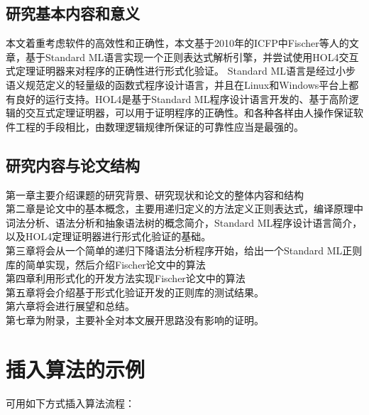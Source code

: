 \documentclass[openany,oneside]{book}
\theoremstyle{definition}
\theoremstyle{definition}
\begin{document}
\section{研究基本内容和意义}
	本文着重考虑软件的高效性和正确性，本文基于2010年的ICFP中Fischer等人的文章，基于Standard ML语言实现一个正则表达式解析引擎，并尝试使用HOL4交互式定理证明器来对程序的正确性进行形式化验证。 Standard ML语言是经过小步语义规范定义的轻量级的函数式程序设计语言，并且在Linux和Windows平台上都有良好的运行支持。HOL4是基于Standard ML程序设计语言开发的、基于高阶逻辑的交互式定理证明器，可以用于证明程序的正确性。和各种各样由人操作保证软件工程的手段相比，由数理逻辑规律所保证的可靠性应当是最强的。

\section{研究内容与论文结构}

	\indent 第一章主要介绍课题的研究背景、研究现状和论文的整体内容和结构\\
	\indent 第二章是论文中的基本概念，主要用递归定义的方法定义正则表达式，编译原理中词法分析、语法分析和抽象语法树的概念简介，Standard ML程序设计语言简介，以及HOL4定理证明器进行形式化验证的基础。\\
	\indent 第三章将会从一个简单的递归下降语法分析程序开始，给出一个Standard ML正则库的简单实现，然后介绍Fischer论文中的算法\cite{fischer2010play}\\
	\indent 第四章利用形式化的开发方法实现Fischer论文中的算法\\
	\indent 第五章将会介绍基于形式化验证开发的正则库的测试结果。\\
	\indent 第六章将会进行展望和总结。\\
	\indent 第七章为附录，主要补全对本文展开思路没有影响的证明。

\chapter{插入算法的示例}

可用如下方式插入算法流程：
\end{document}
